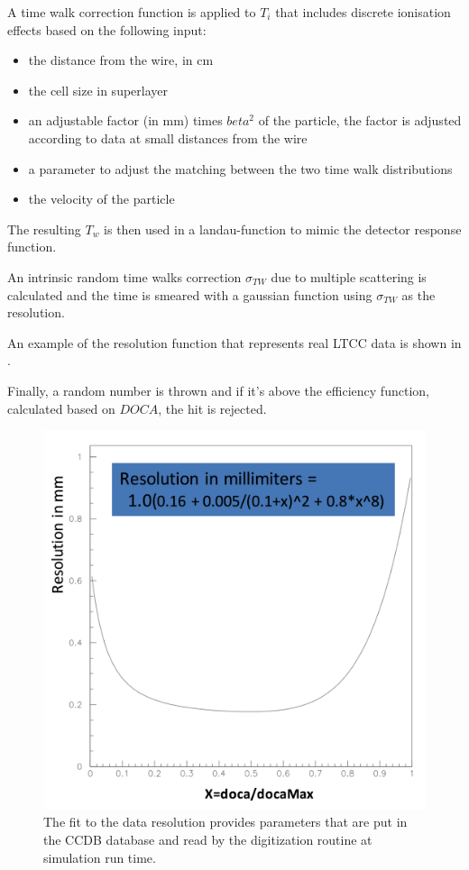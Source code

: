 A time walk correction function is applied to $T_i$ that includes discrete ionisation effects based on the following input:

\begin{itemize}
	\item the distance from the wire, in cm
	\item the cell size in superlayer
	\item an adjustable factor (in mm) times $beta^2$ of the particle, the factor is adjusted according to data at small distances from the wire
	\item a parameter to adjust the matching between the two time walk distributions
	\item the velocity of the particle
\end{itemize}

The resulting $T_w$ is then used in a landau-function to mimic the detector response function.

An intrinsic random time walks correction $\sigma_{TW}$ due to multiple scattering is calculated and the time is smeared with
a gaussian function using $\sigma_{TW}$ as the resolution.

An example of the resolution function that represents real LTCC data is shown in .

Finally, a random number is thrown and if it's above the efficiency function, calculated based on $DOCA$, the hit is rejected.

\begin{figure}
	\centering
	\includegraphics[width=0.95\columnwidth,keepaspectratio]{img/dcResolution.png}
	\caption{The fit to the data resolution provides parameters that are put in the CCDB database and read by the digitization routine at simulation run time.}
	\label{fig:dcResolution}
\end{figure}


